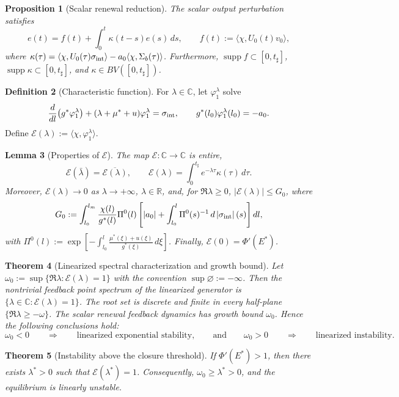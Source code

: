 \documentclass[pdflatex,sn-mathphys-num]{sn-jnl}
\theoremstyle{thmstyleone}
\newtheorem{theorem}{Theorem}[section]
\newtheorem{proposition}[theorem]{Proposition}
\newtheorem{lemma}[theorem]{Lemma}
\theoremstyle{definition}
\newtheorem{definition}[theorem]{Definition}
\theoremstyle{remark}
\newcommand{\R}{\mathbb{R}}
\newcommand{\C}{\mathbb{C}}
\newcommand{\Ev}{\mathcal{E}}
\newcommand{\abs}[1]{\left\lvert#1\right\rvert}
\numberwithin{equation}{section}
\begin{document}
\begin{proposition}[Scalar renewal reduction]
\label{prop:main-renewal}
The scalar output perturbation satisfies
\[
e(t)=f(t)+\int_0^t\kappa(t-s)e(s)\,ds,
\qquad
f(t):=\langle\chi,U_0(t)v_0\rangle ,
\]
where
$\displaystyle 
\kappa(\tau)
=
\langle\chi,U_0(\tau)\sigma_{\rm int}\rangle
-
a_0\langle\chi,\Sigma_b(\tau)\rangle$.
Furthermore,
$\operatorname{supp}f\subset[0,t_\sharp]$,
$\operatorname{supp}\kappa\subset[0,t_\sharp]$,
and
$\kappa\in BV([0,t_\sharp])$.
\end{proposition}
\begin{definition}[Characteristic function]
\label{def:main-characteristic}
For \(\lambda\in\C\), let \(\varphi_1^\lambda\) solve
\[
\frac{d}{dl}\big(g^*\varphi_1^\lambda\big)
+
(\lambda+\mu^*+u)\varphi_1^\lambda
=
\sigma_{\rm int},
\qquad
g^*(l_0)\varphi_1^\lambda(l_0)=-a_0 .
\]
Define
$\displaystyle 
\Ev(\lambda)
:=
\langle\chi,\varphi_1^\lambda\rangle$.
\end{definition}
\begin{lemma}[Properties of \(\Ev\)]
\label{lem:main-Ev-props}
The map \(\Ev:\C\to\C\) is entire,
\[
\Ev(\bar\lambda)=\overline{\Ev(\lambda)},
\qquad
\Ev(\lambda)=\int_0^{t_\sharp}e^{-\lambda\tau}\kappa(\tau)\,d\tau .
\]
Moreover,
$\Ev(\lambda)\to0$ as $\lambda\to+\infty$, $\lambda\in\R$,
and, for \(\Re\lambda\ge0\),
$\displaystyle 
\abs{\Ev(\lambda)}\le G_0$,
where
\[
G_0:=
\int_{l_0}^{l_m}
\frac{\chi(l)}{g^*(l)}
\Pi^0(l)
\left[
\abs{a_0}
+
\int_{l_0}^{l}
\Pi^0(s)^{-1}\,d\abs{\sigma_{\rm int}}(s)
\right]dl,
\]
with
$\displaystyle 
\Pi^0(l):=
\exp\!\left[
-\int_{l_0}^{l}\frac{\mu^*(\xi)+u(\xi)}{g^*(\xi)}\,d\xi
\right]$.
Finally,
$\displaystyle 
\Ev(0)=\Phi'(E^*)$.
\end{lemma}
\begin{theorem}[Linearized spectral characterization and growth bound]
\label{thm:main-spectrum}
Let
$\omega_0
:=
\sup\{\Re\lambda:\Ev(\lambda)=1\}$ with the convention
$\sup\varnothing:=-\infty$.
Then the nontrivial feedback point spectrum of the linearized generator is
$\displaystyle 
\{\lambda\in\C:\Ev(\lambda)=1\}$.
The root set is discrete and finite in every half-plane
$\displaystyle 
\{\Re\lambda\ge-\omega\}$.
The scalar renewal feedback dynamics has growth bound \(\omega_0\). Hence the following conclusions hold:
\[
\omega_0<0
\qquad\Longrightarrow\qquad
\text{linearized exponential stability},\qquad \text{and} \qquad
\omega_0>0
\qquad\Longrightarrow\qquad
\text{linearized instability}.
\]
\end{theorem}
\begin{theorem}[Instability above the closure threshold]
\label{thm:main-instability}
If
$\displaystyle 
\Phi'(E^*)>1$,
then there exists \(\lambda^*>0\) such that
$\displaystyle 
\Ev(\lambda^*)=1$.
Consequently,
$\displaystyle 
\omega_0\ge\lambda^*>0$,
and the equilibrium is linearly unstable.
\end{theorem}
\end{document}
